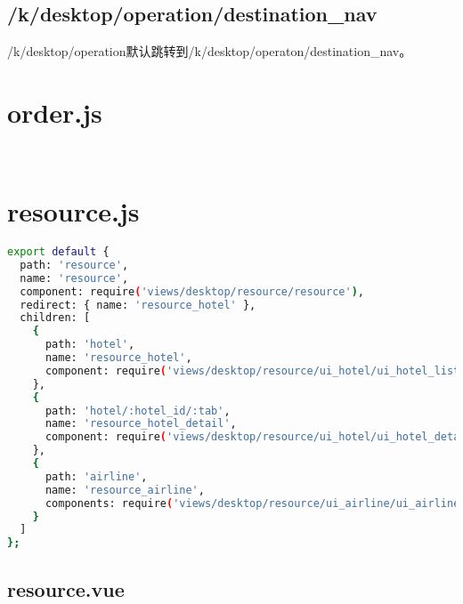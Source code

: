 \begin{lstlisting}[language=bash]

\end{lstlisting}

\subsection{/k/desktop/operation/destination\_nav}


/k/desktop/operation默认跳转到/k/desktop/operaton/destination\_nav。



\section{order.js}


\begin{lstlisting}[language=bash]

\end{lstlisting}



\begin{lstlisting}[language=bash]

\end{lstlisting}


\section{resource.js}



\begin{lstlisting}[language=bash]
export default {
  path: 'resource',
  name: 'resource',
  component: require('views/desktop/resource/resource'),
  redirect: { name: 'resource_hotel' },
  children: [
    {
      path: 'hotel',
      name: 'resource_hotel',
      component: require('views/desktop/resource/ui_hotel/ui_hotel_list')
    },
    {
      path: 'hotel/:hotel_id/:tab',
      name: 'resource_hotel_detail',
      component: require('views/desktop/resource/ui_hotel/ui_hotel_detail')
    },
    {
      path: 'airline',
      name: 'resource_airline',
      components: require('views/desktop/resource/ui_airline/ui_airline_list')
    }
  ]
};
\end{lstlisting}

\subsection{resource.vue}



